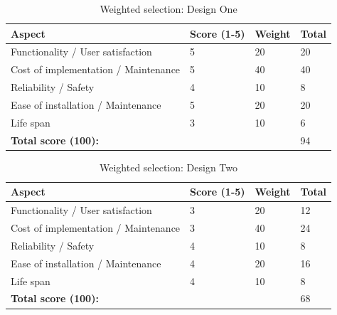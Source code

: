 \begin{table}[H]
\centering
\caption{Weighted selection: Design One\cite{handout}}
\label{weighted-selection-1}
\begin{tabular}{l|l|l|l|}
\textbf{Aspect}                      & \textbf{Score (1-5)} & \textbf{Weight} & \textbf{Total} \\ \hline
Functionality / User satisfaction    & 5                     & 20                & 20               \\
Cost of implementation / Maintenance & 5                     & 40                & 40               \\
Reliability / Safety                 & 4                     & 10                & 8                \\
Ease of installation / Maintenance   & 5                     & 20                & 20               \\
Life span                            & 3                     & 10                & 6                \\ \hline
\textbf{Total score (100):}          &                       &                   & 94              
\end{tabular}
\end{table}

\begin{table}[H]
\centering
\caption{Weighted selection: Design Two\cite{handout}}
\label{weighted-selection-2}
\begin{tabular}{l|l|l|l|}
\textbf{Aspect}                      & \textbf{Score (1-5)} & \textbf{Weight} & \textbf{Total} \\ \hline
Functionality / User satisfaction    & 3                     & 20                & 12               \\
Cost of implementation / Maintenance & 3                     & 40                & 24               \\
Reliability / Safety                 & 4                     & 10                & 8                \\
Ease of installation / Maintenance   & 4                     & 20                & 16               \\
Life span                            & 4                     & 10                & 8                \\ \hline
\textbf{Total score (100):}          &                       &                   & 68              
\end{tabular}
\end{table}

